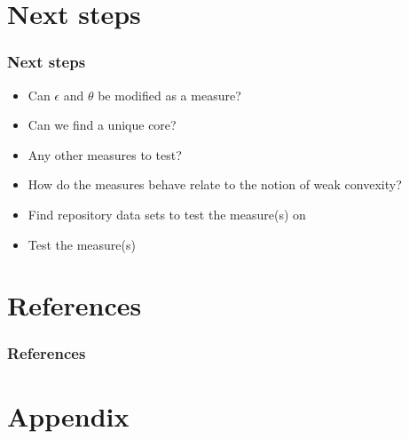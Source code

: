 \documentclass[
    11pt, %
    aspectratio=169, %
    handout
]{beamer}
\begin{document}
\section{Next steps}
\begin{frame}
\frametitle{Next steps}
\begin{itemize}
\item Can $\epsilon$ and $\theta$ be modified as a measure?
\item Can we find a unique core?
\item Any other measures to test?
\item How do the measures behave relate to the notion of weak convexity?
\item Find repository data sets to test the measure(s) on
\item Test the measure(s)
\end{itemize}
\end{frame}

\section{References}
\begin{frame}
\frametitle{References}

 
\end{frame}

\appendix
\section{Appendix}
\end{document}
